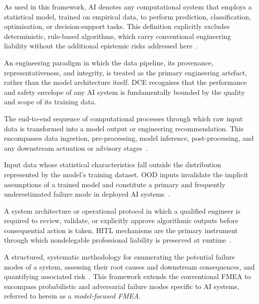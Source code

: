﻿\documentclass[11pt,a4paper]{article}
\newenvironment{deflist}{%
  \begin{description}[
    font=\normalfont\bfseries,
    leftmargin=1.5em,
    labelindent=0em,
    itemsep=4pt,
    parsep=0pt
  ]
}{%
  \end{description}
}
\begin{document}
\begin{deflist}

\item[Artificial Intelligence (AI).] As used in this framework, AI denotes any computational system that employs a statistical model, trained on empirical data, to perform prediction, classification, optimisation, or decision-support tasks. This definition explicitly excludes deterministic, rule-based algorithms, which carry conventional engineering liability without the additional epistemic risks addressed here~\cite{iso22989}.

\item[Data-Centric Engineering (DCE).] An engineering paradigm in which the data pipeline, its provenance, representativeness, and integrity, is treated as the primary engineering artefact, rather than the model architecture itself. DCE recognises that the performance and safety envelope of any AI system is fundamentally bounded by the quality and scope of its training data.

\item[Algorithmic Pipeline.] The end-to-end sequence of computational processes through which raw input data is transformed into a model output or engineering recommendation. This encompasses data ingestion, pre-processing, model inference, post-processing, and any downstream actuation or advisory stages~\cite{sculley2015}.

\item[Out-of-Distribution (OOD) Data.] Input data whose statistical characteristics fall outside the distribution represented by the model's training dataset. OOD inputs invalidate the implicit assumptions of a trained model and constitute a primary and frequently underestimated failure mode in deployed AI systems~\cite{hendrycks2017}.

\item[Human-in-the-Loop (HITL).] A system architecture or operational protocol in which a qualified engineer is required to review, validate, or explicitly approve algorithmic outputs before consequential action is taken. HITL mechanisms are the primary instrument through which nondelegable professional liability is preserved at runtime~\cite{shneiderman2022}.


\item[Failure Mode and Effects Analysis (FMEA).] A structured, systematic methodology for enumerating the potential failure modes of a system, assessing their root causes and downstream consequences, and quantifying associated risk~\cite{iec60812}. This framework extends the conventional FMEA to encompass probabilistic and adversarial failure modes specific to AI systems, referred to herein as a \textit{model-focused FMEA}.

\end{deflist}
\end{document}
